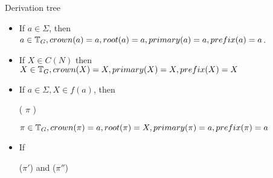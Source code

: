 \documentclass[main.tex]{subfiles}
\begin{document}
\begin{defn}
    Derivation tree
    \begin{itemize}
        \item If $ a \in \Sigma $, then
            $ a \in \mathbb{T}_{ G }, crown(a) = a, root(a) = a, primary(a) = a, prefix(a) = a$.
        \item If $ X \in C(N) $ then $ X \in \mathbb{T}_{ G }, crown(X) = X, primary(X) = X, prefix(X) = X$
        \item If $ a \in \Sigma, X \in f(a) $, then
            \begin{center}
                 ( $ \pi $ )
            \end{center}
            $ \pi \in \mathbb{T}_{ G }, crown(\pi) = a, root(\pi) = X, primary(\pi) = a, prefix(\pi) = a $
        \item If
            \begin{center}
                 ($\pi'$)
                \quad and \quad
                 ($\pi''$)
            \end{center}


\end{itemize}
\end{defn}
\end{document}
